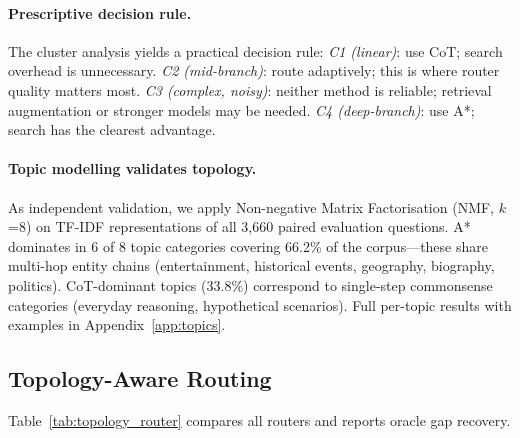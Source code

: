 \documentclass[10pt]{article}
\begin{document}
\paragraph{Prescriptive decision rule.}
The cluster analysis yields a practical decision rule: \emph{C1 (linear)}: use CoT; search overhead is unnecessary. \emph{C2 (mid-branch)}: route adaptively; this is where router quality matters most. \emph{C3 (complex, noisy)}: neither method is reliable; retrieval augmentation or stronger models may be needed. \emph{C4 (deep-branch)}: use A*; search has the clearest advantage.

\paragraph{Topic modelling validates topology.}
As independent validation, we apply Non-negative Matrix Factorisation (NMF, $k$=8) on TF-IDF representations of all 3,660 paired evaluation questions. A* dominates in 6 of 8 topic categories covering 66.2\% of the corpus---these share multi-hop entity chains (entertainment, historical events, geography, biography, politics). CoT-dominant topics (33.8\%) correspond to single-step commonsense categories (everyday reasoning, hypothetical scenarios). Full per-topic results with examples in Appendix~\ref{app:topics}.

\subsection{Topology-Aware Routing}
\label{sec:topology_routing}

Table~\ref{tab:topology_router} compares all routers and reports oracle gap recovery.
\end{document}
